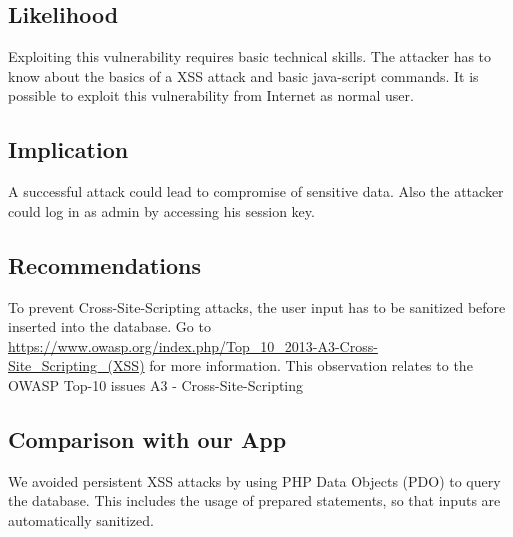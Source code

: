 \subsection{Likelihood}
Exploiting this vulnerability requires basic technical skills. The attacker has to know about the basics of a XSS attack and basic java-script commands. It is possible to exploit this vulnerability from Internet as normal user.

\subsection{Implication}
A successful attack could lead to compromise of sensitive data. Also the attacker could log in as admin by accessing his session key.

\subsection{Recommendations}
To prevent Cross-Site-Scripting attacks, the user input has to be sanitized before inserted into the database. Go to \url{https://www.owasp.org/index.php/Top_10_2013-A3-Cross-Site_Scripting_(XSS)} for more information. \newline
This observation relates to the OWASP Top-10 issues A3 - Cross-Site-Scripting

\subsection{Comparison with our App}
We avoided persistent XSS attacks by using PHP Data Objects (PDO) to query the database. 
This includes the usage of prepared statements, so that 
inputs are automatically sanitized.